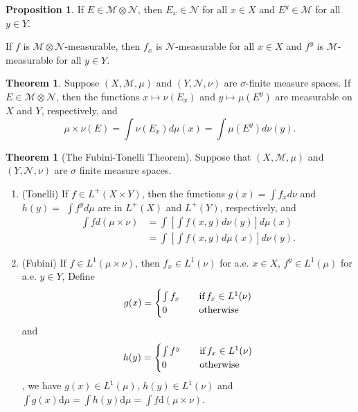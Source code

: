 \documentclass[12pt,a4paper]{book}
\newenvironment{enu}{\begin{enumerate}[(1)]}{\end{enumerate}}
\theoremstyle{definition}
\newtheorem{theo}[defn]{Theorem}
\newtheorem{prop}[defn]{Proposition}
\begin{document}
\begin{prop}
    If $E \in \mathcal{M} \otimes \mathcal{N}$, then $E_x \in \mathcal{N}$ for all $x \in X$ and $E^y \in \mathcal{M}$ for all $y \in Y$.

    If $f$ is $\mathcal{M} \otimes \mathcal{N}$-measurable, then $f_x$ is $\mathcal{N}$-measurable for all $x \in X$ and $f^y$ is $\mathcal{M}$-measurable for all $y \in Y$.
\end{prop}
\begin{theo}
    Suppose $(X, \mathcal{M}, \mu)$ and $(Y, \mathcal{N}, \nu)$ are $\sigma$-finite measure spaces. If $E \in \mathcal{M} \otimes \mathcal{N}$, then the functions $x \mapsto \nu\left(E_x\right)$ and $y \mapsto \mu\left(E^y\right)$ are measurable on $X$ and $Y$, respectively, and
    $$
        \mu \times \nu(E)=\int \nu\left(E_x\right) d \mu(x)=\int \mu\left(E^y\right) d \nu(y) .
    $$
\end{theo}
\begin{theo}[The Fubini-Tonelli Theorem]
    Suppose that $(X, \mathcal{M}, \mu)$ and $(Y, \mathcal{N}, \nu)$ are $\sigma$ finite measure spaces.
    \begin{enu}
        \item (Tonelli) If $f \in L^{+}(X \times Y)$, then the functions $g(x)=\int f_x d \nu$ and $h(y)=$ $\int f^y d \mu$ are in $L^{+}(X)$ and $L^{+}(Y)$, respectively, and
        $$
            \begin{aligned}
                \int f d(\mu \times \nu) & =\int\left[\int f(x, y) d \nu(y)\right] d \mu(x)   \\
                                         & =\int\left[\int f(x, y) d \mu(x)\right] d \nu(y) .
            \end{aligned}
        $$
        \item (Fubini) If $f \in L^1(\mu \times \nu)$, then $f_x \in L^1(\nu)$ for a.e. $x \in X$, $f^y \in L^1(\mu)$ for a.e. $y \in Y$,
        Define
        \begin{equation*}
            g(x)=\begin{cases}
                \int f_x   & \quad \text{if\,} f_x\in L^1(\nu) \\
                0          &\text{\quad otherwise}
            \end{cases}
        \end{equation*}
        and 
        \begin{equation*}
            h(y)=\begin{cases}
                \int f^y &\quad \text{if\,} f_x\in L^1(\nu) \\
                0        &\text{\quad otherwise}
            \end{cases}
        \end{equation*}
        , we have $g(x)\in L^1(\mu)$, $h(y)\in L^1(\nu)$ and $\int g(x)\text{d}\mu=\int h(y)\text{d}\mu=\int f \text{d}(\mu\times \nu)$.
    \end{enu}
\end{theo}
\newpage 
\end{document}
